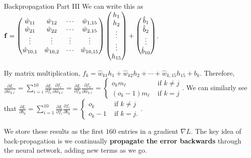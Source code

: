 \documentclass[xcolor=dvipsnames, fontsize=11pt, %
pagesize, %
parskip=half-, t]{beamer}
\begin{document}
\begin{frame}{Backpropagation Part III}
We can write this as $\bold{f}=\begin{pmatrix} \hat{w}_{11} & \hat{w}_{12} & \cdots & \hat{w}_{1,15} \\ \hat{w}_{21} & \hat{w}_{22} & \cdots & \hat{w}_{2,15} \\ \vdots & \vdots & \vdots & \vdots \\ \hat{w}_{10,1} & \hat{w}_{10,2} & \cdots & \hat{w}_{10,15} \end{pmatrix}\begin{pmatrix} h_{1} \\ h_2 \\ \vdots \\ \vdots \\ h_{15} \end{pmatrix}+\begin{pmatrix} \hat{b}_{1} \\ \hat{b}_2 \\ \vdots \\ \hat{b}_{10} \end{pmatrix}$. \vspace{0.025\textheight} \pause 

By matrix multiplication, $f_k=\hat{w}_{k1}h_1+\hat{w}_{k2}h_2+\cdots+\hat{w}_{k,15}h_{15}+b_k$. \pause Therefore, $\displaystyle \frac{\partial L}{\partial \hat{w}_{k\ell}}=\sum_{i=i}^{10} \frac{\partial L}{\partial f_i}\frac{\partial f_i}{\partial \hat{w}_{k\ell }}=\frac{\partial L}{\partial f_k}\frac{\partial f_k}{\partial \hat{w}_{k\ell}}=\begin{cases} o_km_{\ell} & \text{ if } k\neq j \\ 
\left(o_k-1\right)m_{\ell} & \text{ if } k=j \end{cases}$. \pause We can similarly see that $\displaystyle \frac{\partial L}{\partial b_k}=\sum_{i=1}^{10} \frac{\partial L}{\partial f_i}\frac{\partial f_i}{\partial b_k}=\begin{cases} o_k & \text{ if } k\neq j \\ o_k-1&  \text{ if } k=j. \end{cases}$. \pause \vspace{0.025\textheight}

We store these results as the first $160$ entries in a gradient $\nabla L$. The key idea of back-propagation is we continually \textbf{propagate the error backwards} through the neural network, adding new terms as we go.

\end{frame}
\end{document}
